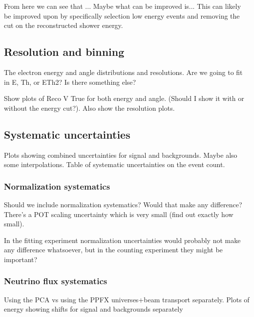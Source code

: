From here we can see that ... Maybe what can be improved is...
This can likely be improved upon by specifically selection low energy events and removing the cut on the reconstructed shower energy. 

\subsection{Resolution and binning}
The electron energy and angle distributions and resolutions. Are we going to fit in E, Th, or ETh2? Is there something else?

Show plots of Reco V True for both energy and angle. (Should I show it with or without the energy cut?). Also show the resolution plots.

\subsection{Systematic uncertainties}
Plots showing combined uncertainties for signal and backgrounds. Maybe also some interpolations. Table of systematic uncertainties on the event count.

\subsubsection*{Normalization systematics}
Should we include normalization systematics? Would that make any difference? There's a POT scaling uncertainty which is very small (find out exactly how small).

In the fitting experiment normalization uncertainties would probably not make any difference whatsoever, but in the counting experiment they might be important?

\subsubsection*{Neutrino flux systematics}
Using the PCA vs using the PPFX universes+beam transport separately. Plots of energy showing shifts for signal and backgrounds separately

